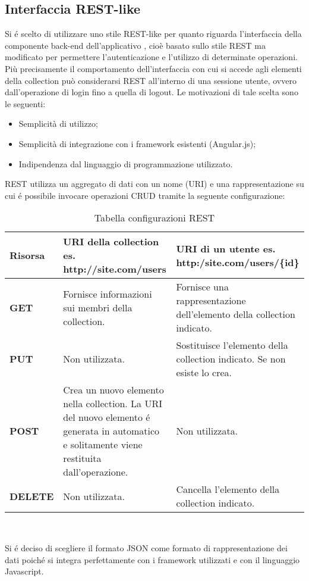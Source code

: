 \newpage
\subsection{Interfaccia REST-like}
Si é scelto di utilizzare uno stile \gls{REST-like} per quanto riguarda l'interfaccia della componente \gls{back-end} dell'applicativo \PROGETTO, cioè basato sullo stile \gls{REST} ma modificato per permettere l'autenticazione e l'utilizzo di determinate operazioni. Più precisamente il comportamento dell'interfaccia con cui si accede agli elementi della collection può considerarsi \gls{REST} all'interno di una sessione utente, ovvero dall'operazione di login fino a quella di logout. Le motivazioni di tale scelta sono le seguenti:
\begin{itemize}
	\item Semplicità di utilizzo;
	\item Semplicità di integrazione con i \gls{framework} esistenti (\gls{Angular.js});
	\item Indipendenza dal \gls{linguaggio di programmazione} utilizzato.
	\end{itemize}
	\gls{REST} utilizza un aggregato di dati con un nome (\gls{URI}) e una rappresentazione su cui é possibile invocare operazioni \gls{CRUD} tramite la seguente configurazione:
	
	\begin{table}[h]
		\begin{tabular}{|p{}|p{}|p{}|}
			\toprule
			
			\textbf{Risorsa} & \textbf{\gls{URI} della collection} \smallbreak
			es. http://site.com/users  & \textbf{\gls{URI} di un utente} \smallbreak
			es. http:/site.com/users/\{id\} \\
			
			\midrule
			\textbf{GET} & Fornisce informazioni sui membri della collection. & Fornisce una rappresentazione dell'elemento della collection indicato. \\ \midrule
			\textbf{PUT} & Non utilizzata. & Sostituisce l'elemento della collection indicato. Se non esiste lo crea. \\  \midrule
			\textbf{POST} & Crea un nuovo elemento nella collection. La \gls{URI} del nuovo elemento é generata in automatico e solitamente viene restituita dall'operazione. & Non utilizzata. \\ \midrule
			\textbf{DELETE} & Non utilizzata. & Cancella l'elemento della collection indicato.  \\ \midrule
			
			
			\end{tabular}\\
			\caption{Tabella configurazioni REST}
			
			\end{table}
			
Si é deciso di scegliere il formato \gls{JSON} come formato di rappresentazione dei dati poiché si integra perfettamente con i \gls{framework} utilizzati e con il linguaggio \gls{Javascript}.
